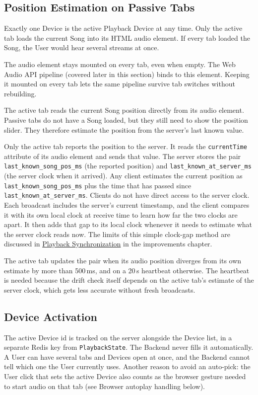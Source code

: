 \subsection{Position Estimation on Passive Tabs}
Exactly one Device is the active Playback Device at any time. Only the
active tab loads the current Song into its HTML audio element. If every
tab loaded the Song, the User would hear several streams at once.

The audio element stays mounted on every tab, even when empty. The
Web Audio API pipeline (covered later in this section) binds to this
element. Keeping it mounted on every tab lets the same pipeline
survive tab switches without rebuilding.

The active tab reads the current Song position directly from its audio
element. Passive tabs do not have a Song loaded, but they still need
to show the position slider. They therefore estimate the position from
the server's last known value.

Only the active tab reports the position to the server. It reads the
\texttt{currentTime} attribute of its audio element and sends that
value.
The server stores the pair \texttt{last\_known\_song\_pos\_ms} (the reported position) and
\texttt{last\_known\_at\_server\_ms} (the server clock when it
arrived). Any client estimates the current position as
\texttt{last\_known\_song\_pos\_ms} plus the time that has passed
since \texttt{last\_known\_at\_server\_ms}. Clients do not have
direct access to the server clock. Each broadcast includes the
server's current timestamp, and the client compares it with its own
local clock at receive time to learn how far the two clocks are
apart. It then adds that gap to its local clock whenever it needs
to estimate what the server clock reads now. The limits of this
simple clock-gap method are discussed in
\hyperref[subsec:imp_clock]{Playback Synchronization} in the
improvements chapter.

The active tab updates the pair when its audio position diverges
from its own estimate by more than 500\,ms, and on a 20\,s heartbeat
otherwise. The heartbeat is needed because the drift check itself
depends on the active tab's estimate of the server clock, which gets
less accurate without fresh broadcasts.

\subsection{Device Activation}
The active Device id is tracked on the server alongside the Device
list, in a separate Redis key from \texttt{PlaybackState}. The Backend
never fills it automatically. A User can have several tabs and Devices
open at once, and the Backend cannot tell which one the User currently
uses. Another reason to avoid an auto-pick: the User click that sets the
active Device also counts as the browser gesture needed to start
audio on that tab (see Browser autoplay handling below).

